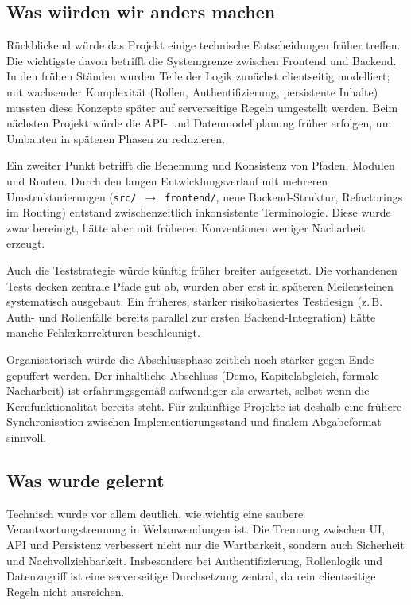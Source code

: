 \subsection{Was würden wir anders machen}

Rückblickend würde das Projekt einige technische Entscheidungen früher treffen.
Die wichtigste davon betrifft die Systemgrenze zwischen Frontend und Backend.
In den frühen Ständen wurden Teile der Logik zunächst clientseitig modelliert;
mit wachsender Komplexität (Rollen, Authentifizierung, persistente Inhalte)
mussten diese Konzepte später auf serverseitige Regeln umgestellt werden.
Beim nächsten Projekt würde die API- und Datenmodellplanung früher erfolgen, um
Umbauten in späteren Phasen zu reduzieren.

Ein zweiter Punkt betrifft die Benennung und Konsistenz von Pfaden, Modulen und
Routen.
Durch den langen Entwicklungsverlauf mit mehreren Umstrukturierungen
(\texttt{src/}~$\rightarrow$~\texttt{frontend/}, neue Backend-Struktur,
Refactorings im Routing) entstand zwischenzeitlich inkonsistente Terminologie.
Diese wurde zwar bereinigt, hätte aber mit früheren Konventionen weniger
Nacharbeit erzeugt.

Auch die Teststrategie würde künftig früher breiter aufgesetzt.
Die vorhandenen Tests decken zentrale Pfade gut ab, wurden aber erst in späteren
Meilensteinen systematisch ausgebaut.
Ein früheres, stärker risikobasiertes Testdesign (z.\,B. Auth- und
Rollenfälle bereits parallel zur ersten Backend-Integration) hätte manche
Fehlerkorrekturen beschleunigt.

Organisatorisch würde die Abschlussphase zeitlich noch stärker gegen Ende
gepuffert werden.
Der inhaltliche Abschluss (Demo, Kapitelabgleich, formale Nacharbeit) ist
erfahrungsgemäß aufwendiger als erwartet, selbst wenn die Kernfunktionalität
bereits steht.
Für zukünftige Projekte ist deshalb eine frühere Synchronisation zwischen
Implementierungsstand und finalem Abgabeformat sinnvoll.

\subsection{Was wurde gelernt}

Technisch wurde vor allem deutlich, wie wichtig eine saubere
Verantwortungstrennung in Webanwendungen ist.
Die Trennung zwischen UI, API und Persistenz verbessert nicht nur die
Wartbarkeit, sondern auch Sicherheit und Nachvollziehbarkeit.
Insbesondere bei Authentifizierung, Rollenlogik und Datenzugriff ist eine
serverseitige Durchsetzung zentral, da rein clientseitige Regeln nicht
ausreichen.

